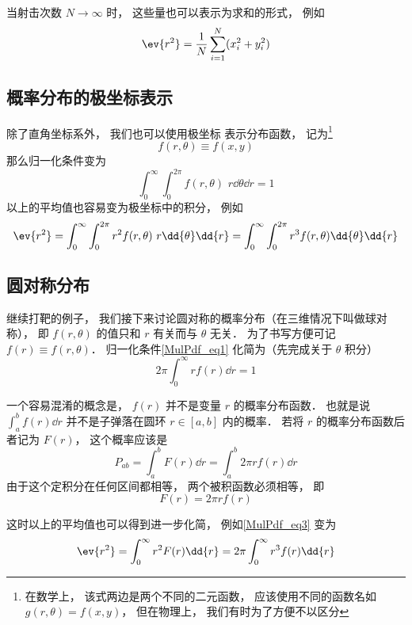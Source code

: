 当射击次数 $N \to \infty$ 时， 这些量也可以表示为求和的形式， 例如
\begin{equation}
\ev{r^2} = \frac{1}{N}\sum_{i=1}^N (x_i^2 + y_i^2)
\end{equation}


\subsection{概率分布的极坐标表示}

除了直角坐标系外， 我们也可以使用极坐标 表示分布函数， 记为\footnote{在数学上， 该式两边是两个不同的二元函数， 应该使用不同的函数名如 $g(r, \theta) = f(x, y)$， 但在物理上， 我们有时为了方便不以区分}
\begin{equation}
f(r, \theta) \equiv f(x, y)
\end{equation}
那么归一化条件变为
\begin{equation}\label{MulPdf_eq1}
\int_0^\infty \int_{0}^{2\pi} f(r, \theta)\,\, r\dd{\theta}\dd{r} = 1
\end{equation}
以上的平均值也容易变为极坐标中的积分， 例如
\begin{equation}\label{MulPdf_eq3}
\ev{r^2} = \int_0^\infty \int_{0}^{2\pi} r^2 f(r, \theta)\,\, r\dd{\theta}\dd{r}
= \int_0^\infty \int_{0}^{2\pi} r^3 f(r, \theta) \dd{\theta}\dd{r}
\end{equation}


\subsection{圆对称分布}
继续打靶的例子， 我们接下来讨论圆对称的概率分布（在三维情况下叫做球对称）， 即 $f(r, \theta)$ 的值只和 $r$ 有关而与 $\theta$ 无关． 为了书写方便可记 $f(r) \equiv f(r, \theta)$． 归一化条件\autoref{MulPdf_eq1} 化简为（先完成关于 $\theta$ 积分）
\begin{equation}
2\pi \int_0^\infty r f(r) \dd{r} = 1
\end{equation}

一个容易混淆的概念是， $f(r)$ 并不是变量 $r$ 的概率分布函数． 也就是说 $\int_a^b f(r) \dd{r}$ 并不是子弹落在圆环 $r \in [a, b]$ 内的概率． 若将 $r$ 的概率分布函数后者记为 $F(r)$， 这个概率应该是
\begin{equation}\label{MulPdf_eq4}
P_{ab} = \int_a^b F(r) \dd{r} = \int_a^b 2\pi r f(r) \dd{r}
\end{equation}
由于这个定积分在任何区间都相等， 两个被积函数必须相等， 即
\begin{equation}\label{MulPdf_eq5}
F(r) = 2\pi r f(r)
\end{equation}

这时以上的平均值也可以得到进一步化简， 例如\autoref{MulPdf_eq3} 变为
\begin{equation}
\ev{r^2} = \int_0^\infty r^2 F(r) \dd{r}
= 2\pi \int_0^\infty r^3 f(r) \dd{r}
\end{equation}
